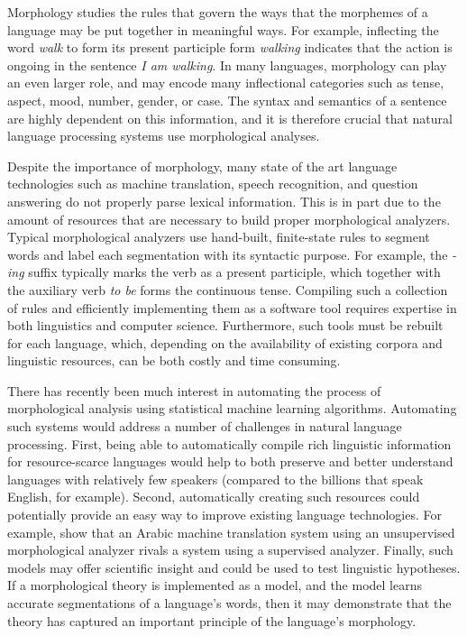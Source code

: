 Morphology studies the rules that govern the ways that the morphemes
of a language may be put together in meaningful ways. For example,
inflecting the word \textit{walk} to form its present participle form
\textit{walking} indicates that the action is ongoing in the sentence
\textit{I am walking}. In many languages, morphology can play an even
larger role, and may encode many inflectional categories such as
tense, aspect, mood, number, gender, or case. The syntax and semantics
of a sentence are highly dependent on this information, and it is
therefore crucial that natural language processing systems use
morphological analyses.

Despite the importance of morphology, many state of the art language
technologies such as machine translation, speech recognition, and
question answering do not properly parse lexical information. This is
in part due to the amount of resources that are necessary to build
proper morphological analyzers. Typical morphological analyzers use
hand-built, finite-state rules to segment words and label each
segmentation with its syntactic purpose. For example, the
\textit{-ing} suffix typically marks the verb as a present participle,
which together with the auxiliary verb \textit{to be} forms the
continuous tense. Compiling such a collection of rules and efficiently
implementing them as a software tool requires expertise in both
linguistics and computer science. Furthermore, such tools must be
rebuilt for each language, which, depending on the availability of
existing corpora and linguistic resources, can be both costly and time
consuming.

There has recently been much interest in automating the process of
morphological analysis using statistical machine learning
algorithms. Automating such systems would address a number of
challenges in natural language processing. First, being able to
automatically compile rich linguistic information for resource-scarce
languages would help to both preserve and better understand languages
with relatively few speakers (compared to the billions that speak
English, for example). Second, automatically creating such resources
could potentially provide an easy way to improve existing language
technologies. For example, \cite{stallard2012} show that an Arabic
machine translation system using an unsupervised morphological
analyzer rivals a system using a supervised analyzer. Finally, such
models may offer scientific insight and could be used to test
linguistic hypotheses. If a morphological theory is implemented as a
model, and the model learns accurate segmentations of a language's
words, then it may demonstrate that the theory has captured an
important principle of the language's morphology.

